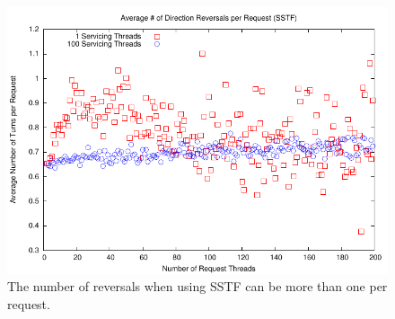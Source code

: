 \documentclass[12pt]{report}
\begin{document}
\begin{figure}[htb!]
    \centering
    \includegraphics[scale=1]{turnsSSTF.pdf}
    \caption{The number of reversals when using SSTF can be more than one per request.}
    \label{fig:turnsSSTF}
\end{figure}


\newpage
\end{document}
